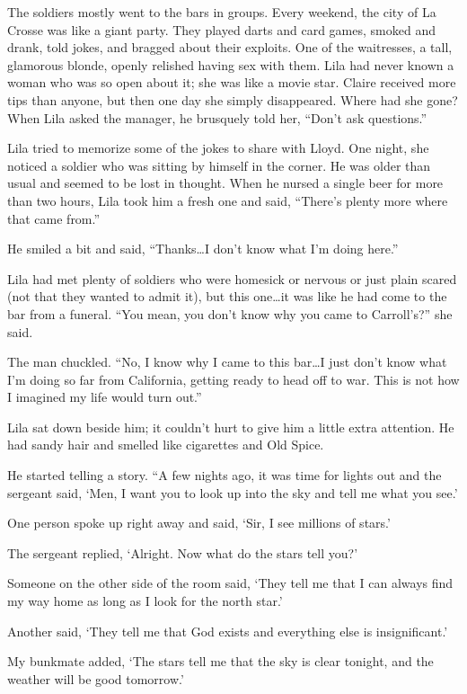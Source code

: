 \documentclass[
  american,
  letterpaper,
]{book}
\begin{document}
The soldiers mostly went to the bars in groups. Every weekend, the city
of La Crosse was like a giant party. They played darts and card games,
smoked and drank, told jokes, and bragged about their exploits. One of
the waitresses, a tall, glamorous blonde, openly relished having sex
with them. Lila had never known a woman who was so open about it; she
was like a movie star. Claire received more tips than anyone, but then
one day she simply disappeared. Where had she gone? When Lila asked the
manager, he brusquely told her, ``Don't ask questions.''

Lila tried to memorize some of the jokes to share with Lloyd. One night,
she noticed a soldier who was sitting by himself in the corner. He was
older than usual and seemed to be lost in thought. When he nursed a
single beer for more than two hours, Lila took him a fresh one and said,
``There's plenty more where that came from.''

He smiled a bit and said, ``Thanks\ldots I don't know what I'm doing
here.''

Lila had met plenty of soldiers who were homesick or nervous or just
plain scared (not that they wanted to admit it), but this one\ldots it
was like he had come to the bar from a funeral. ``You mean, you don't
know why you came to Carroll's?'' she said.

The man chuckled. ``No, I know why I came to this bar\ldots I just don't
know what I'm doing so far from California, getting ready to head off to
war. This is not how I imagined my life would turn out.''

Lila sat down beside him; it couldn't hurt to give him a little extra
attention. He had sandy hair and smelled like cigarettes and Old Spice.

He started telling a story. ``A few nights ago, it was time for lights
out and the sergeant said, `Men, I want you to look up into the sky and
tell me what you see.'

One person spoke up right away and said, `Sir, I see millions of stars.'

The sergeant replied, `Alright. Now what do the stars tell you?'

Someone on the other side of the room said, `They tell me that I can
always find my way home as long as I look for the north star.'

Another said, `They tell me that God exists and everything else is
insignificant.'

My bunkmate added, `The stars tell me that the sky is clear tonight, and
the weather will be good tomorrow.'
\end{document}
